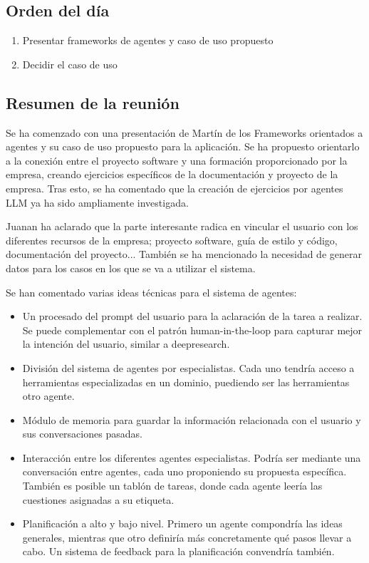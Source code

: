 \subsection{Orden del día}
\begin{enumerate}
    \item Presentar frameworks de agentes y caso de uso propuesto
    \item Decidir el caso de uso
\end{enumerate}

\subsection{Resumen de la reunión}
Se ha comenzado con una presentación de Martín de los Frameworks orientados a agentes y su caso de uso propuesto para la aplicación. Se ha propuesto orientarlo a la conexión entre el proyecto software y una formación proporcionado por la empresa, creando ejercicios específicos de la documentación y proyecto de la empresa. Tras esto, se ha comentado que la creación de ejercicios por agentes LLM ya ha sido ampliamente investigada.

Juanan ha aclarado que la parte interesante radica en vincular el usuario con los diferentes recursos de la empresa; proyecto software, guía de estilo y código, documentación del proyecto...
También se ha mencionado la necesidad de generar datos para los casos en los que se va a utilizar el sistema.

Se han comentado varias ideas técnicas para el sistema de agentes:
\begin{itemize}
    \item Un procesado del prompt del usuario para la aclaración de la tarea a realizar. Se puede complementar con el patrón human-in-the-loop para capturar mejor la intención del usuario, similar a deepresearch.
    \item División del sistema de agentes por especialistas. Cada uno tendría acceso a herramientas especializadas en un dominio, puediendo ser las herramientas otro agente.
    \item Módulo de memoria para guardar la información relacionada con el usuario y sus conversaciones pasadas.
    \item Interacción entre los diferentes agentes especialistas. Podría ser mediante una conversación entre agentes, cada uno proponiendo su propuesta específica. También es posible un tablón de tareas, donde cada agente leería las cuestiones asignadas a su etiqueta.
    \item Planificación a alto y bajo nivel. Primero un agente compondría las ideas generales, mientras que otro definiría más concretamente qué pasos llevar a cabo. Un sistema de feedback para la planificación convendría también.
\end{itemize}

